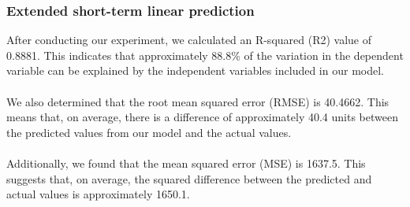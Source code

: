         \subsubsection{Extended short-term linear prediction} \label{subsec:res_estlp}
        After conducting our experiment, we calculated an R-squared (R2) value of 0.8881.
        This indicates that approximately 88.8\% of the variation in the dependent
        variable can be explained by the independent variables included in our model.\\
        \\
        We also determined that the root mean squared error (RMSE) is 40.4662.
        This means that, on average, there is a difference of approximately 40.4
        units between the predicted values from our model and the actual values.\\
        \\
        Additionally, we found that the mean squared error (MSE) is 1637.5.
        This suggests that, on average, the squared difference between the predicted
        and actual values is approximately 1650.1.
